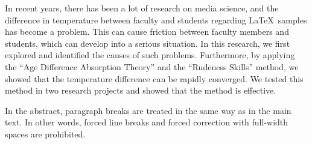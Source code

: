 In recent years, there has been a lot of research on media science,
and the difference in temperature between faculty and students regarding
\LaTeX~samples has become a problem.
This can cause friction between faculty members and students, 
which can develop into a serious situation.
In this research, we first explored and identified the causes of such problems.
Furthermore, by applying the ``Age Difference Absorption Theory'' and
the ``Rudeness Skills'' method, we showed that the temperature difference can be rapidly converged.
We tested this method in two research projects and showed that the method is effective.

In the abstract, paragraph breaks are treated in the same way as in the main text.
In other words, forced line breaks and forced correction with full-width spaces are prohibited.

